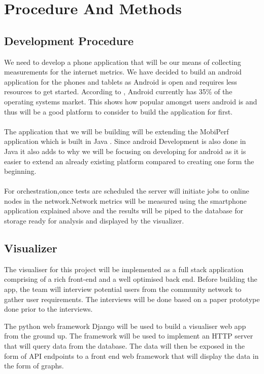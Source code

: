 \section{Procedure And Methods}
\subsection{Development Procedure}
We need to develop a phone application that will be our means of collecting measurements for the internet metrics. We have decided to build an android application for the phones and tablets as Android is open and requires less resources to get started. According to \cite{statcounter_global_stats}, Android currently has 35\% of the operating systems market. This shows how popular amongst users android is and thus will be a good platform to consider to build the application for first. 
\paragraph{}
The application that we will be building will be extending the MobiPerf application which is built in Java \cite{m-lab}. Since android Development is also done in Java it also adds to why we will be focusing on developing for android as it is easier to extend an already existing platform compared to creating one form the beginning.

\paragraph{}
For orchestration,once tests are scheduled the server will initiate jobs to online nodes in the network.Network metrics will be measured using the smartphone application explained above and the results will be piped to the database for storage ready for analysis and displayed by the visualizer.    

\subsection{Visualizer}
The visualiser for this project will be implemented as a full stack application comprising of a rich front-end and a well optimised back end. Before building the app, the team will interview potential users from the community network to gather user requirements. The interviews will be done based on a paper prototype done prior to the interviews.

The python web framework Django will be used to build a visualiser web app from the ground up. The framework will be used to implement an HTTP server that will query data from the database. The data will then be exposed in the form of API endpoints to a front end web framework that will display the data in the form of graphs.

